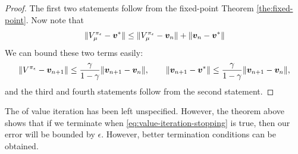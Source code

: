   \begin{proof}
    The first two statements follow from the fixed-point Theorem \ref{the:fixed-point}.
    Now note that
    \[
    \|V^{\pol_\epsilon}_\mdp - \val^*\|
    \leq
    \|V^{\pol_\epsilon}_\mdp - \val_n\|
    +
    \|\val_n - \val^*\|
    \]
    We can bound these two terms easily:  %
    \[
    \norm{V^{\pol_\epsilon} - \val_{n+1}} 
    \leq
    \frac{\disc}{1 - \disc}\|\val_{n+1} - \val_{n}\|,
    \qquad
    \|\val_{n+1} - \val^*\|
    \leq
    \frac{\disc}{1 - \disc}\|\val_{n+1} - \val_{n}\|,
    \]
    and the third and fourth statements follow from the second statement.
  \end{proof}

  The  of value iteration has been left unspecified. However, the theorem above shows that if we terminate when \eqref{eq:value-iteration-stopping} is true, then our error will be bounded by $\epsilon$. However, better termination conditions can be obtained.

